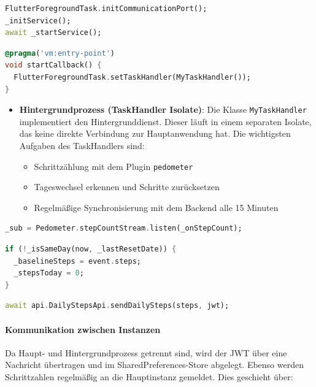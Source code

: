 \documentclass[11pt,a4paper]{article}
\begin{document}
\begin{lstlisting}[language=Dart, caption=Initialisierung des Foreground Task]
FlutterForegroundTask.initCommunicationPort();
_initService();
await _startService();
\end{lstlisting}

\begin{lstlisting}[language=Dart, caption=Registrierung des Task Handlers]
@pragma('vm:entry-point')
void startCallback() {
  FlutterForegroundTask.setTaskHandler(MyTaskHandler());
}
\end{lstlisting}

\begin{itemize}[leftmargin=1.5em]
    \item \textbf{Hintergrundprozess (TaskHandler Isolate)}: Die Klasse \texttt{MyTaskHandler} implementiert den Hintergrunddienst. Dieser läuft in einem separaten Isolate, das keine direkte Verbindung zur Hauptanwendung hat. Die wichtigsten Aufgaben des TaskHandlers sind:
    \begin{itemize}
        \item Schrittzählung mit dem Plugin \texttt{pedometer}
        \item Tageswechsel erkennen und Schritte zurücksetzen
        \item Regelmäßige Synchronisierung mit dem Backend alle 15 Minuten
    \end{itemize}
\end{itemize}

\begin{lstlisting}[language=Dart, caption=Schrittzählung starten]
_sub = Pedometer.stepCountStream.listen(_onStepCount);
\end{lstlisting}

\begin{lstlisting}[language=Dart, caption=Tageswechsel erkennen]
if (!_isSameDay(now, _lastResetDate)) {
  _baselineSteps = event.steps;
  _stepsToday = 0;
}
\end{lstlisting}

\begin{lstlisting}[language=Dart, caption=Synchronisierung mit dem Backend]
await api.DailyStepsApi.sendDailySteps(steps, jwt);
\end{lstlisting}

\paragraph{Kommunikation zwischen Instanzen}
Da Haupt- und Hintergrundprozess getrennt sind, wird der JWT über eine Nachricht übertragen und im SharedPreferences-Store abgelegt. Ebenso werden Schrittzahlen regelmäßig an die Hauptinstanz gemeldet. Dies geschieht über:
\end{document}
